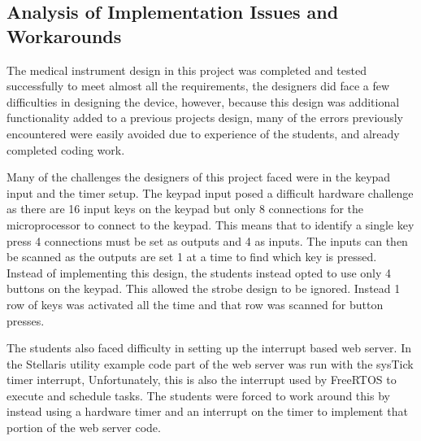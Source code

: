 \documentclass[12pt]{article} %
\begin{document}
    \subsection{Analysis of Implementation Issues and Workarounds}



    The medical instrument design in this project was completed and tested
    successfully to meet almost all the requirements, the designers did face a
    few difficulties in designing the device, however, because this design was
    additional functionality added to a previous projects design, many of the
    errors previously encountered were easily avoided due to experience of the
    students, and already completed coding work.
    
    
    Many of the challenges the designers of this project faced were in the
    keypad input and the timer setup. The keypad input posed a difficult
    hardware challenge as there are 16 input keys on the keypad but only 8
    connections for the microprocessor to connect to the keypad. This means
    that to identify a single key press 4 connections must be set as outputs
    and 4 as inputs. The inputs can then be scanned as the outputs are set 1 at
    a time to find which key is pressed. Instead of implementing this design,
    the students instead opted to use only 4 buttons on the keypad. This
    allowed the strobe design to be ignored. Instead 1 row of keys was
    activated all the time and that row was scanned for button presses.
    
The students also faced difficulty in setting up the interrupt based web server.
In the Stellaris utility example code part of the web server was run with the sysTick timer
interrupt, Unfortunately, this is also the interrupt used by FreeRTOS to execute and schedule tasks.
The students were forced to work around this by instead using a hardware timer and an interrupt on 
the timer to implement that portion of the web server code.
    
\end{document}
